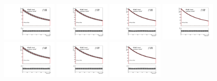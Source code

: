 \begin{figure}[htbp]
  \centering
 \includegraphics[width=0.24\textwidth]{figures/VBF/Spurious_ExpoO2_testVBF_ICHEP_4cen_SRI.pdf}
 \includegraphics[width=0.24\textwidth]{figures/VBF/Spurious_ExpoO2_testVBF_ICHEP_4cen_SRII.pdf}
 \includegraphics[width=0.24\textwidth]{figures/VBF/Spurious_ExpoO2_testVBF_ICHEP_4cen_SRIII.pdf}
 \includegraphics[width=0.24\textwidth]{figures/VBF/Spurious_ExpoO2_testVBF_ICHEP_4cen_SRIV.pdf}\\
 \includegraphics[width=0.24\textwidth]{figures/VBF/Spurious_SExpoO2_testVBF_ICHEP_4cen_SRI.pdf}
 \includegraphics[width=0.24\textwidth]{figures/VBF/Spurious_SExpoO2_testVBF_ICHEP_4cen_SRII.pdf}
 \includegraphics[width=0.24\textwidth]{figures/VBF/Spurious_SExpoO2_testVBF_ICHEP_4cen_SRIII.pdf}

\end{figure}
